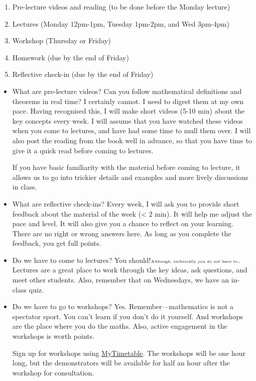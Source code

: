 \documentclass{amsart}
\begin{document}
\begin{enumerate}
\item Pre-lecture videos and reading (to be done before the Monday lecture)
\item Lectures (Monday 12pm-1pm, Tuesday 1pm-2pm, and Wed 3pm-4pm)
\item Workshop (Thursday or Friday)
\item Homework (due by the end of Friday)
\item Reflective check-in (due by the end of Friday)
\end{enumerate}
\begin{itemize}
\item What are pre-lecture videos?
\label{sec:org3fc7be9}
Can you follow mathematical definitions and theorems in real time?  I certainly cannot.  I need to digest them at my own pace.  Having recognised this, I will make short videos (5-10 min) about the key concepts every week.  I will assume that you have watched these videos when you come to lectures, and have had some time to mull them over.  I will also post the reading from the book well in advance, so that you have time to give it a quick read before coming to lectures.  

If you have basic familiarity with the material before coming to lecture, it allows us to go into trickier details and examples and more lively discussions in class.  
\item What are reflective check-ins?
\label{sec:org7e1fac7}
Every week, I will ask you to provide short feedback about the material of the week (< 2 min).  It will help me adjust the pace and level.  It will also give you a chance to reflect on your learning.  There are no right or wrong answers here.  As long as you complete the feedback, you get full points.
\item Do we have to come to lectures?
\label{sec:orgf57d760}
You should!\(\tiny{\textrm{Although, technically you do not have to}}\).  Lectures are a great place to work through the key ideas, ask questions, and meet other students.  Also, remember that on Wednesdays, we have an in-class quiz.
\item Do we have to go to workshops?
\label{sec:org60a1556}
Yes.  Remember---mathematics is not a spectator sport.  You can't learn if you don't do it yourself.  And workshops are the place where you do the maths.  Also, active engagement in the workshops is worth points.

Sign up for workshops using \href{https://services.anu.edu.au/information-technology/software-systems/mytimetable}{MyTimetable}.
The workshops will be one hour long, but the demonstrators will be available for half an hour after the workshop for consultation.
\end{itemize}
\end{document}
